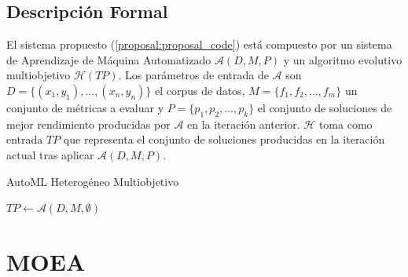 \subsection{Descripci\'on Formal}
El sistema propuesto (\ref{proposal:proposal_code}) est\'a compuesto por un sistema de Aprendizaje de M\'aquina Automatizado $\mathcal{A}(D, M, P)$  y un algoritmo evolutivo multiobjetivo $\mathcal{H}(TP)$. Los par\'ametros de entrada de $\mathcal{A}$ son $D = \{(x_1, y_1), ..., (x_n, y_n)\}$ el corpus de datos, $M = \{f_1, f_2, ..., f_m\}$ un conjunto de m\'etricas a evaluar y $P = \{p_1, p_2, ..., p_k\}$ el conjunto de soluciones de mejor rendimiento producidas por  $\mathcal{A}$ en la iteraci\'on anterior. $\mathcal{H}$ toma como entrada $TP$ que representa el conjunto de soluciones producidas en la iteraci\'on actual tras aplicar $\mathcal{A}(D, M, P)$. 
\begin{algorithm}[ht]
    \caption{AutoML Heterog\'eneo Multiobjetivo}
    \label{proposal:proposal_code}
    $TP \gets \mathcal{A}(D, M, \emptyset)$ 
\end{algorithm}


\section{MOEA}

